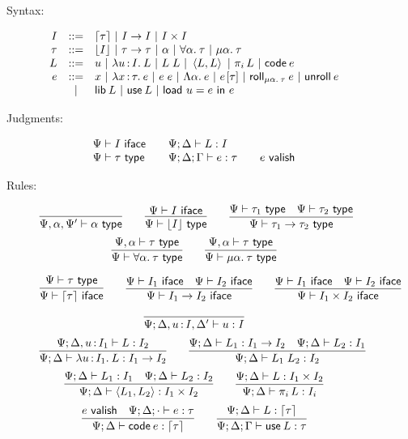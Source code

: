 \documentclass[11pt]{article}
\begin{document}
\begin{figure}[p]
  \centering
  \begin{description}
  \item[Syntax:]
    \[\begin{array}{rcl}
      I &::=& \lceil{\tau}\rceil ~|~ I \to I ~|~ I \times I\\
      \tau &::=&  \lfloor{I}\rfloor ~|~ \tau \to \tau ~|~ \alpha ~|~ \forall \alpha .\: \tau
      ~|~ \mu \alpha .\: \tau\\
      L &::=& u ~|~ \lambda u \mathop{:} I .\: L ~|~ L \; L ~|~ \left\langle L,L\right\rangle ~|~ \pi_{i} \, L
      ~|~ \textsf{code}\:{e}\\
      e &::=& x ~|~ \lambda x \mathop{:} \tau .\: e ~|~ e \; e
      ~|~ \Lambda \alpha .\: e ~|~ e\hspace{1pt}[\tau]
      ~|~ \textsf{roll}_{\mu \alpha .\: \tau}\:{e} ~|~ \textsf{unroll}\:{e}\\
      &~|~& \textsf{lib}\:{L} ~|~ \textsf{use}\:{L} ~|~ \textsf{load}~{u}={e}~\textsf{in}~{e}
    \end{array}\]
  \item[Judgments:]\[
    \begin{array}[]{lll}
      \Psi \ent I \isiface &\quad \Psi;\D \ent L \isa I\\
      \Psi \ent \tau \istype &\quad \Psi;\D;\G \ent e \isa \tau
      &\quad e \valish
    \end{array}\]
  \item[Rules:]
    \[
    \infer{\Psi, \alpha, \Psi' \ent \alpha \istype}{} \qquad
    \infer{\Psi \ent \dn{I} \istype}{\Psi \ent I \isiface} \qquad
    \infer{\Psi \ent \tau_1 \to \tau_2 \istype}{
      \Psi \ent \tau_1 \istype &
      \Psi \ent \tau_2 \istype}
    \]\[
    \infer{\Psi \ent \fa{\alpha}{\tau} \istype}{
      \Psi,\alpha \ent \tau \istype} \qquad
    \infer{\Psi \ent \trec{\alpha}{\tau} \istype}{
      \Psi,\alpha \ent \tau \istype}
    \]

    \[
    \infer{\Psi \ent \up{\tau} \isiface}{\Psi \ent \tau \istype} \qquad
    \infer{\Psi \ent I_1 \to I_2 \isiface}{
      \Psi \ent I_1 \isiface &
      \Psi \ent I_2 \isiface} \qquad
    \infer{\Psi \ent I_1 \x I_2 \isiface}{
      \Psi \ent I_1 \isiface &
      \Psi \ent I_2 \isiface}
    \]

    \[
    \infer{\Psi; \D, u \of I, \D' \ent u \isa I}{}
    \]\[
    \infer{\Psi; \D \ent \lam{u}{I_1}{L} \isa I_1 \to I_2}{
      \Psi;\D, u \of I_1 \ent L \isa I_2} \qquad
    \infer{\Psi; \D \ent L_1 \ap L_2 \isa I_2}{
      \Psi;\D \ent L_1 \isa I_1 \to I_2 &
      \Psi;\D \ent L_2 \isa I_1}
    \]\[
    \infer{\Psi; \D \ent \<L_1, L_2\> \isa I_1 \x I_2}{
      \Psi; \D \ent L_1 \isa I_1 &
      \Psi; \D \ent L_2 \isa I_2} \qquad
    \infer{\Psi; \D \ent \proj{i}{L} \isa I_i}{
      \Psi;\D \ent L \isa I_1 \x I_2}
    \]\[
    \infer{\Psi;\D \ent \code{e} \isa \up{\tau}}{
      e \valish &
      \Psi;\D;\ecx \ent e \isa \tau} \qquad
    \infer{\Psi;\D;\G \ent \use{L} \isa \tau}{
      \Psi;\D \ent L \isa \up{\tau}}
    \]


\end{description}
\end{figure}
\end{document}
